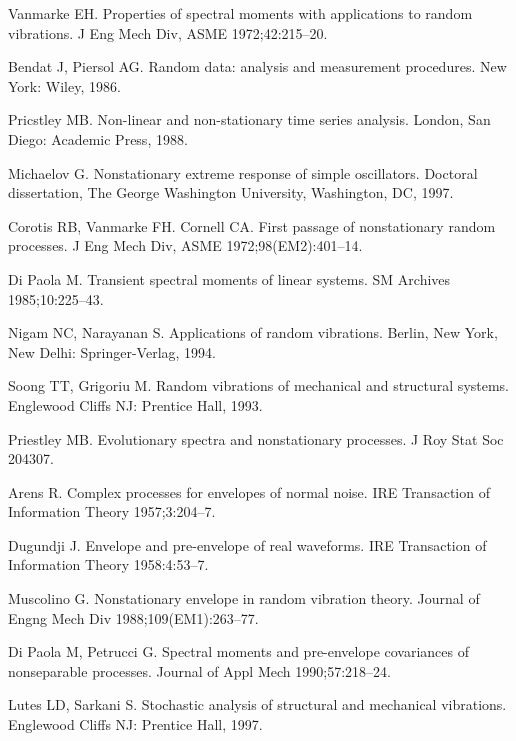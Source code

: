 \documentclass{article}
\begin{document}
\begin{thebibliography}{99}
  {}Vanmarke EH. Properties of spectral moments with
  applications to random vibrations. J Eng Mech Div, ASME 1972;42:215--20.
  
  {}Bendat J, Piersol AG. Random data: analysis and
  measurement procedures. New York: Wiley, 1986.
  
  {}Pricstley MB. Non-linear and non-stationary time
  series analysis. London, San Diego: Academic Press, 1988.
  
  {}Michaelov G. Nonstationary extreme response of
  simple oscillators. Doctoral dissertation, The George Washington University,
  Washington, DC, 1997.
  
  {}Corotis RB, Vanmarke FH. Cornell CA. First passage of
  nonstationary random processes. J Eng Mech Div, ASME 1972;98(EM2):401--14.
  
  {}Di Paola M. Transient spectral moments of linear
  systems. SM Archives 1985;10:225--43.
  
  {}Nigam NC, Narayanan S. Applications of random
  vibrations. Berlin, New York, New Delhi: Springer-Verlag, 1994.
  
  {}Soong TT, Grigoriu M. Random vibrations of
  mechanical and structural systems. Englewood Cliffs NJ: Prentice Hall, 1993.
  
  {}Priestley MB. Evolutionary spectra and
  nonstationary processes. J Roy Stat Soc 204307.
  
  {}Arens R. Complex processes for envelopes of normal
  noise. IRE Transaction of Information Theory 1957;3:204--7.
  
  {}Dugundji J. Envelope and pre-envelope of real
  waveforms. IRE Transaction of Information Theory 1958:4:53--7.
  
  {}Muscolino G. Nonstationary envelope in random
  vibration theory. Journal of Engng Mech Div 1988;109(EM1):263--77.
  
  {}Di Paola M, Petrucci G. Spectral moments and
  pre-envelope covariances of nonseparable processes. Journal of Appl Mech
  1990;57:218--24.
  
  {}Lutes LD, Sarkani S. Stochastic analysis of
  structural and mechanical vibrations. Englewood Cliffs NJ: Prentice Hall,
  1997.
  

\end{thebibliography}
\end{document}
